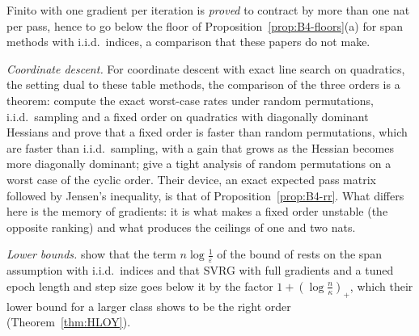 Finito with one gradient per iteration is \emph{proved} to contract by more than one nat per pass, hence to go below the floor of Proposition~\ref{prop:B4-floors}(a) for span methods with i.i.d.\ indices, a comparison that these papers do not make.

\emph{Coordinate descent.} For coordinate descent with exact line search on quadratics, the setting dual to these table methods, the comparison of the three orders is a theorem: \cite{gurbuzbalaban2020randomness} compute the exact worst-case rates under random permutations, i.i.d.\ sampling and a fixed order on quadratics with diagonally dominant Hessians and prove that a fixed order is faster than random permutations, which are faster than i.i.d.\ sampling, with a gain that grows as the Hessian becomes more diagonally dominant; \cite{lee2019random} give a tight analysis of random permutations on a worst case of the cyclic order. Their device, an exact expected pass matrix followed by Jensen's inequality, is that of Proposition~\ref{prop:B4-rr}. What differs here is the memory of gradients: it is what makes a fixed order unstable (the opposite ranking) and what produces the ceilings of one and two nats.

\emph{Lower bounds.} \cite{hannah2018breaking} show that the term $n\log\frac1\varepsilon$ of the bound of \cite{lan2018optimal} rests on the span assumption with i.i.d.\ indices and that SVRG with full gradients and a tuned epoch length and step size goes below it by the factor $1+(\log\frac n\kappa)_+$, which their lower bound for a larger class shows to be the right order (Theorem~\ref{thm:HLOY}).

